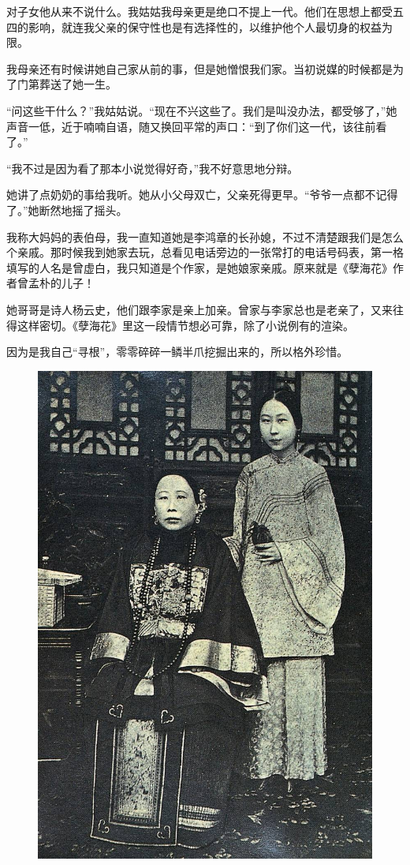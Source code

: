 \par 对子女他从来不说什么。我姑姑我母亲更是绝口不提上一代。他们在思想上都受五四的影响，就连我父亲的保守性也是有选择性的，以维护他个人最切身的权益为限。
\par 我母亲还有时候讲她自己家从前的事，但是她憎恨我们家。当初说媒的时候都是为了门第葬送了她一生。
\par “问这些干什么？”我姑姑说。“现在不兴这些了。我们是叫没办法，都受够了，”她声音一低，近于喃喃自语，随又换回平常的声口：“到了你们这一代，该往前看了。”
\par “我不过是因为看了那本小说觉得好奇，”我不好意思地分辩。
\par 她讲了点奶奶的事给我听。她从小父母双亡，父亲死得更早。“爷爷一点都不记得了。”她断然地摇了摇头。
\par 我称大妈妈的表伯母，我一直知道她是李鸿章的长孙媳，不过不清楚跟我们是怎么个亲戚。那时候我到她家去玩，总看见电话旁边的一张常打的电话号码表，第一格填写的人名是曾虚白，我只知道是个作家，是她娘家亲戚。原来就是《孽海花》作者曾孟朴的儿子！
\par 她哥哥是诗人杨云史，他们跟李家是亲上加亲。曾家与李家总也是老亲了，又来往得这样密切。《孽海花》里这一段情节想必可靠，除了小说例有的渲染。
\par 因为是我自己“寻根”，零零碎碎一鳞半爪挖掘出来的，所以格外珍惜。
\begin{figure}[htb]
    \centering %
    \includegraphics[scale=0.35]{picture/对照记22.jpeg}
\end{figure}


